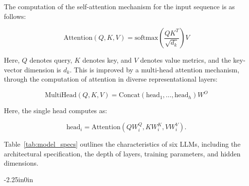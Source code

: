 \documentclass[10pt,letterpaper]{article}
\begin{document}
The computation of the self-attention mechanism for the input sequence is as follows:

\begin{equation}
\text{Attention}(Q, K, V) = \text{softmax}\left(\frac{QK^{T}}{\sqrt{d_k}}\right)V
\label{eq:attention}
\end{equation}

Here, \(Q\) denotes query, \(K\) denotes key, and \(V\) denotes value metrics, and the key-vector dimension is \(d_k\). This is improved by a multi-head attention mechanism, through the computation of attention in diverse representational layers:

\begin{equation}
\text{MultiHead}(Q, K, V) = \text{Concat}(\text{head}_1, \ldots, \text{head}_h)W^{O}
\label{eq:multihead}
\end{equation}

Here, the single head computes as: 

\begin{equation}
\text{head}_i = \text{Attention}(QW^{Q}_i, KW^{K}_i, VW^{V}_i).
\label{eq:head}
\end{equation}

Table~\ref{tab:model_specs} outlines the characteristics of six LLMs, including the architectural specification, the depth of layers, training parameters, and hidden dimensions.  

\begin{table}[!t]
\begin{adjustwidth}{-2.25in}{0in}
\centering
\caption{Detailed Architectural Specifications of Evaluated Large Language Models.}
\label{tab:model_specs}
\renewcommand{\arraystretch}{1.2}
\setlength{\tabcolsep}{5pt}
\end{adjustwidth}
\vspace{-0.3cm}
\end{table}
\end{document}

